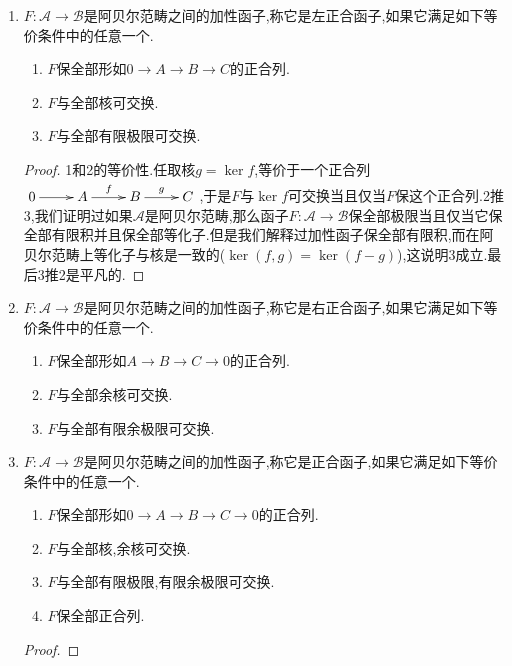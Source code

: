 \begin{enumerate}
	\item $F:\mathscr{A}\to\mathscr{B}$是阿贝尔范畴之间的加性函子,称它是左正合函子,如果它满足如下等价条件中的任意一个.
	\begin{enumerate}
		\item $F$保全部形如$0\to A\to B\to C$的正合列.
		\item $F$与全部核可交换.
		\item $F$与全部有限极限可交换.
	\end{enumerate}
    \begin{proof}
    	
    	1和2的等价性.任取核$g=\ker f$,等价于一个正合列$\xymatrix{0\ar[r]&A\ar[r]^f&B\ar[r]^g&C}$,于是$F$与$\ker f$可交换当且仅当$F$保这个正合列.2推3,我们证明过如果$\mathscr{A}$是阿贝尔范畴,那么函子$F:\mathscr{A}\to\mathscr{B}$保全部极限当且仅当它保全部有限积并且保全部等化子.但是我们解释过加性函子保全部有限积,而在阿贝尔范畴上等化子与核是一致的($\ker(f,g)=\ker(f-g)$),这说明3成立.最后3推2是平凡的.
    \end{proof}
    \item $F:\mathscr{A}\to\mathscr{B}$是阿贝尔范畴之间的加性函子,称它是右正合函子,如果它满足如下等价条件中的任意一个.
    \begin{enumerate}
    	\item $F$保全部形如$A\to B\to C\to0$的正合列.
    	\item $F$与全部余核可交换.
    	\item $F$与全部有限余极限可交换.
    \end{enumerate}
    \item $F:\mathscr{A}\to\mathscr{B}$是阿贝尔范畴之间的加性函子,称它是正合函子,如果它满足如下等价条件中的任意一个.
    \begin{enumerate}
    	\item $F$保全部形如$0\to A\to B\to C\to0$的正合列.
    	\item $F$与全部核,余核可交换.
    	\item $F$与全部有限极限,有限余极限可交换.
    	\item $F$保全部正合列.
    \end{enumerate}
    \begin{proof}
    	

\end{proof}
\end{enumerate}
